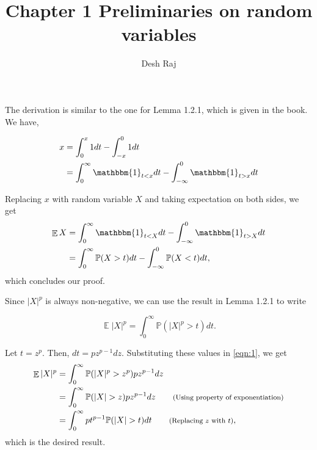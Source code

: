 \documentclass[11pt]{article}
\newenvironment{exercise}[2][Exercise]{\begin{trivlist}
\item[\hskip \labelsep {\bfseries #1}\hskip \labelsep {\bfseries #2.}]}{\end{trivlist}}
\newenvironment{solution}[1][Solution]{\begin{trivlist}
\item[\hskip \labelsep {\bfseries #1}\hskip \labelsep]}{\end{trivlist}}
\DeclareMathOperator*{\E}{\mathbb{E}}
\newcommand*{\annot}[1]{\tag*{\footnotesize{(#1)}}}
\begin{document}
 
 
\title{Chapter 1 Preliminaries on random variables}
\author{Desh Raj} 
 
\maketitle
 
\begin{exercise}{1.2.2}
\end{exercise}
 
\begin{solution}
The derivation is similar to the one for Lemma 1.2.1, which is given in the book. We have,

\begin{align*}
x &= \int_0^x 1 dt - \int_{-x}^0 1 dt \\ 
  &= \int_0^{\infty} \mathbbm{1}_{t<x} dt - \int_{-\infty}^0 \mathbbm{1}_{t>x} dt
\end{align*}

Replacing $x$ with random variable $X$ and taking expectation on both sides, we get
\begin{align*}
\E X &= \int_0^{\infty} \mathbbm{1}_{t<X} dt - \int_{-\infty}^0 \mathbbm{1}_{t>X} dt \\
	 &= \int_0^{\infty} \mathbb{P}(X>t) dt - \int_{-\infty}^0 \mathbb{P}(X<t) dt,
\end{align*}
which concludes our proof.

\end{solution}

\begin{exercise}{1.2.3}
\end{exercise}

\begin{solution}
Since $|X|^p$ is always non-negative, we can use the result in Lemma 1.2.1 to write

\begin{equation}
\E |X|^p = \int_0^{\infty}\mathbb{P}(|X|^p > t)dt.
\label{eqn:1}
\end{equation}

Let $t = z^p$. Then, $dt = pz^{p-1}dz$. Substituting these values in \ref{eqn:1}, we get
\begin{align*}
\E |X|^p &= \int_0^{\infty} \mathbb{P}(|X|^p > z^p) pz^{p-1} dz \\
		&= \int_0^{\infty} \mathbb{P}(|X| > z) pz^{p-1} dz \annot{Using property of exponentiation} \\
		&= \int_0^{\infty} pt^{p-1}\mathbb{P}(|X| > t) dt \annot{Replacing $z$ with $t$},
\end{align*}
which is the desired result.
\end{solution}
\end{document}
